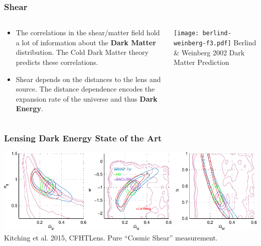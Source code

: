 \documentclass{beamer}
\begin{document}
\frame
{
    \frametitle{Shear}

    \begin{columns}
        \begin{column}{0.5\textwidth}
            \begin{itemize}


                \item The correlations in the shear/matter field hold a lot of
                    information about the {\bf Dark Matter} distribution.  The Cold Dark
                    Matter theory predicts these correlations.

                \item Shear depends on the distances to the lens and source. The
                    distance dependence encodes the expansion rate of the universe and
                    thus {\bf Dark Energy}.


            \end{itemize}
        \end{column}

        \begin{column}{0.5\textwidth}
                \texttt{[image: berlind-weinberg-f3.pdf]}
                \newline
                Berlind \& Weinberg 2002
                \newline
                Dark Matter Prediction
        \end{column}
    \end{columns}
}


\frame
{
    \frametitle{Lensing Dark Energy State of the Art}

    \begin{center}
        \includegraphics[width=\textwidth]{cfht-wmap.pdf}
        \newline
        Kitching et al. 2015, CFHTLens.  Pure ``Cosmic Shear'' measurement.
    \end{center}

}
\end{document}
